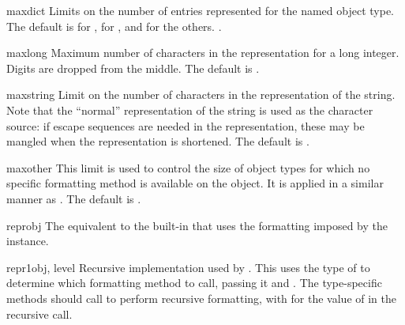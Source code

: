 \begin{memberdesc}[Repr]{maxdict}
  Limits on the number of entries represented for the named object
  type.  The default is  for ,  for
  , and   for the others.
  .
\end{memberdesc}

\begin{memberdesc}[Repr]{maxlong}
  Maximum number of characters in the representation for a long
  integer.  Digits are dropped from the middle.  The default is
  .
\end{memberdesc}

\begin{memberdesc}[Repr]{maxstring}
  Limit on the number of characters in the representation of the
  string.  Note that the ``normal'' representation of the string is
  used as the character source: if escape sequences are needed in the
  representation, these may be mangled when the representation is
  shortened.  The default is .
\end{memberdesc}

\begin{memberdesc}[Repr]{maxother}
  This limit is used to control the size of object types for which no
  specific formatting method is available on the  object.
  It is applied in a similar manner as .  The
  default is .
\end{memberdesc}

\begin{methoddesc}[Repr]{repr}{obj}
  The equivalent to the built-in  that uses the
  formatting imposed by the instance.
\end{methoddesc}

\begin{methoddesc}[Repr]{repr1}{obj, level}
  Recursive implementation used by .  This uses the
  type of  to determine which formatting method to call,
  passing it  and .  The type-specific methods
  should call  to perform recursive formatting, with
   for the value of  in the recursive 
  call.
\end{methoddesc}

